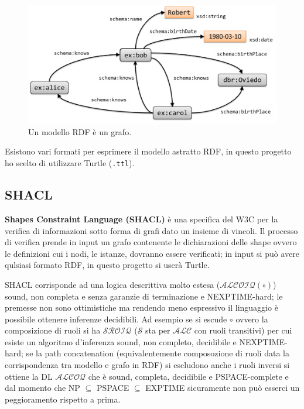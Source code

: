 \documentclass{article}
\begin{document}
\begin{figure}[h!t]
    \caption{Un modello RDF è un grafo.}
    \label{fig:graph}
    \includegraphics[scale=0.3]{images/RDFGraph.png}
    \centering
\end{figure}

Esistono vari formati per esprimere il modello astratto RDF, in questo progetto ho scelto di utilizzare Turtle (\texttt{.ttl}).

\subsection{SHACL}
\textbf{Shapes Constraint Language (SHACL)} è una specifica del W3C per la verifica di informazioni sotto forma di grafi dato un insieme di vincoli. Il processo di verifica prende in input un grafo contenente le dichiarazioni delle shape ovvero le definizioni cui i nodi, le istanze, dovranno essere verificati; in input si può avere qulsiasi formato RDF, in questo progetto si userà Turtle. 

SHACL corrisponde ad una logica descrittiva molto estesa ($\mathcal{ALCOIQ(\circ)}$) sound, non completa e senza garanzie di terminazione e NEXPTIME-hard; le premesse non sono ottimistiche ma rendendo meno espressivo il linguaggio è possibile ottenere inferenze decidibili. Ad esempio se si escude $\circ$ ovvero la composizione di ruoli si ha $\mathcal{SROIQ}$ ($\mathcal{S}$ sta per $\mathcal{ALC}$ con ruoli transitivi) per cui esiste un algoritmo d'inferenza sound, non completo, decidibile e NEXPTIME-hard; se la path concatenation (equivalentemente composozione di ruoli data la corrispondenza tra modello e grafo in RDF) si escludono anche i ruoli inversi si ottiene la DL $\mathcal{ALCOQ}$ che è sound, completa, decidibile e PSPACE-complete e dal momento che NP $\subseteq$ PSPACE $\subseteq$ EXPTIME sicuramente non può esserci un peggioramento rispetto a prima. 
\end{document}
